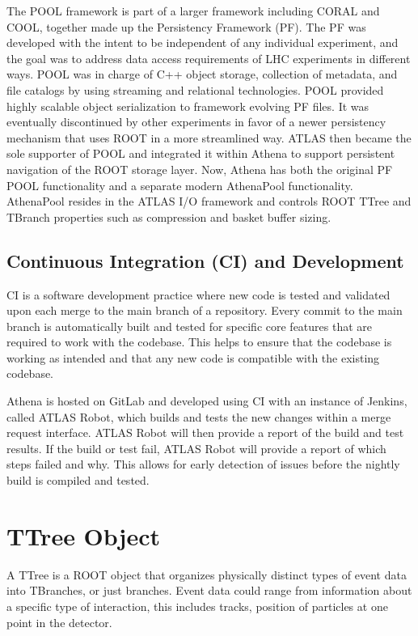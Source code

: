 The POOL framework is part of a larger framework including CORAL and COOL, together made up the Persistency Framework (PF). \cite{Trentadue_2012}
The PF was developed with the intent to be independent of any individual experiment, and the goal was to address data access requirements of LHC experiments in different ways.
POOL was in charge of C++ object storage, collection of metadata, and file catalogs by using streaming and relational technologies. 
POOL provided highly scalable object serialization to framework evolving PF files. 
It was eventually discontinued by other experiments in favor of a newer persistency mechanism that uses ROOT in a more streamlined way.
ATLAS then became the sole supporter of POOL and integrated it within Athena to support persistent navigation of the ROOT storage layer.
Now, Athena has both the original PF POOL functionality and a separate modern AthenaPool functionality. 
AthenaPool resides in the ATLAS I/O framework and controls ROOT TTree and TBranch properties such as compression and basket buffer sizing.


\subsection{Continuous Integration (CI) and Development}
CI is a software development practice where new code is tested and validated upon each merge to the main branch of a repository. 
Every commit to the main branch is automatically built and tested for specific core features that are required to work with the codebase. 
This helps to ensure that the codebase is working as intended and that any new code is compatible with the existing codebase.

Athena is hosted on GitLab and developed using CI with an instance of Jenkins, called ATLAS Robot, which builds and tests the new changes within a merge request interface. 
ATLAS Robot will then provide a report of the build and test results.
If the build or test fail, ATLAS Robot will provide a report of which steps failed and why.
This allows for early detection of issues before the nightly build is compiled and tested.



\section{TTree Object} \label{section: ATLASIO_TTreeObject}
A TTree is a ROOT object that organizes physically distinct types of event data into TBranches, or just branches.
Event data could range from information about a specific type of interaction, this includes tracks, position of particles at one point in the detector. 

